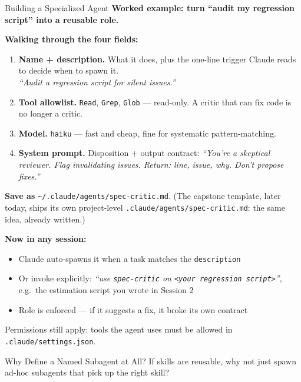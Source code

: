 \documentclass[aspectratio=169, 11pt]{beamer}
\begin{document}
\begin{frame}[fragile,shrink=6]{Building a Specialized Agent}
  \textbf{Worked example: turn ``audit my regression script'' into a reusable role.}

  \vspace{0.4em}
  \textbf{Walking through the four fields:}
  \begin{enumerate}\small
    \item \textbf{Name + description.} What it does, plus the one-line trigger Claude reads to decide when to spawn it.\\
    \emph{``Audit a regression script for silent issues.''}
    \item \textbf{Tool allowlist.} \texttt{Read}, \texttt{Grep}, \texttt{Glob} --- read-only. A critic that can fix code is no longer a critic.
    \item \textbf{Model.} \texttt{haiku} --- fast and cheap, fine for systematic pattern-matching.
    \item \textbf{System prompt.} Disposition + output contract: \emph{``You're a skeptical reviewer. Flag invalidating issues. Return: line, issue, why. Don't propose fixes.''}
  \end{enumerate}

  \vspace{0.3em}
  \textbf{Save as} \texttt{\textasciitilde/.claude/agents/spec-critic.md}. (The capstone template, later today, ships its own project-level \texttt{.claude/agents/spec-critic.md}: the same idea, already written.)

  \vspace{0.3em}
  \textbf{Now in any session:}
  \begin{itemize}\small
    \item Claude auto-spawns it when a task matches the \texttt{description}
    \item Or invoke explicitly: \emph{``use \texttt{spec-critic} on \texttt{<your regression script>}''}, e.g.\ the estimation script you wrote in Session 2
    \item Role is enforced --- if it suggests a fix, it broke its own contract
  \end{itemize}

  \vspace{0.2em}
  \alert{\small Permissions still apply: tools the agent uses must be allowed in \texttt{.claude/settings.json}.}
\end{frame}

\begin{frame}{Why Define a Named Subagent at All?}
  \centering
  \vspace{2em}
  {\Large If skills are reusable, why not just spawn\\[0.3em]
  ad-hoc subagents that pick up the right skill?}

\end{frame}
\end{document}
